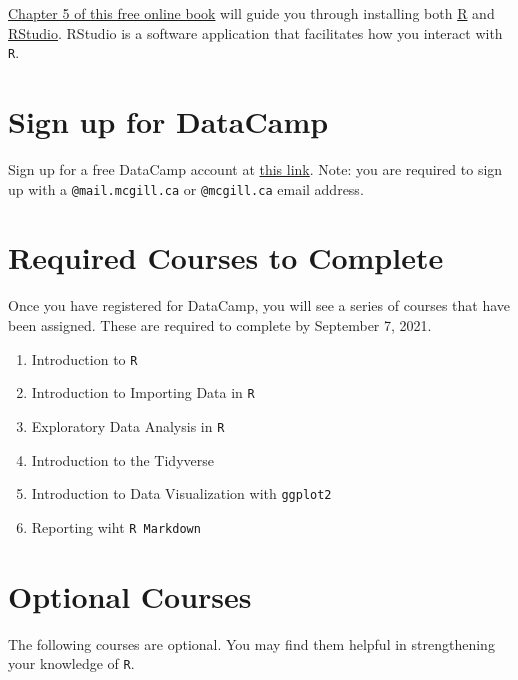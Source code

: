 \documentclass[letterpaper,12pt,twoside,]{pinp}
\providecommand{\tightlist}{%
  \setlength{\itemsep}{0pt}\setlength{\parskip}{0pt}}
\begin{document}
\href{https://datascienceineducation.com/c05.html}{Chapter 5 of this
free online book} will guide you through installing both
\href{https://cran.r-project.org/}{R} and
\href{https://www.rstudio.com/products/rstudio/download/preview/}{RStudio}.
RStudio is a software application that facilitates how you interact with
\texttt{R}.

\hypertarget{sign-up-for-datacamp}{%
\section{Sign up for DataCamp}\label{sign-up-for-datacamp}}

Sign up for a free DataCamp account at
\href{https://www.datacamp.com/groups/shared_links/3dae8b789a824d0761a650b316c1d10a25cda8934ccf214aa7cd8366d07ed301}{this
link}. Note: you are required to sign up with a \texttt{@mail.mcgill.ca}
or \texttt{@mcgill.ca} email address.

\hypertarget{required-courses-to-complete}{%
\section{Required Courses to
Complete}\label{required-courses-to-complete}}

Once you have registered for DataCamp, you will see a series of courses
that have been assigned. These are required to complete by September 7,
2021.

\begin{enumerate}
\def\labelenumi{\arabic{enumi}.}
\tightlist
\item
  Introduction to \texttt{R}
\item
  Introduction to Importing Data in \texttt{R}
\item
  Exploratory Data Analysis in \texttt{R}
\item
  Introduction to the Tidyverse
\item
  Introduction to Data Visualization with \texttt{ggplot2}
\item
  Reporting wiht \texttt{R\ Markdown}
\end{enumerate}

\hypertarget{optional-courses}{%
\section{Optional Courses}\label{optional-courses}}

The following courses are optional. You may find them helpful in
strengthening your knowledge of \texttt{R}.
\end{document}
